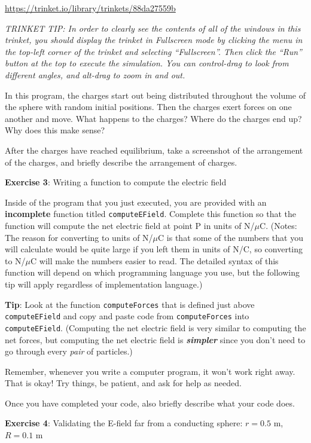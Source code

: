 \documentclass[]{article}
\begin{document}
\url{https://trinket.io/library/trinkets/88da27559b}

\emph{TRINKET TIP: In order to clearly see the contents of all of the
windows in this trinket, you should display the trinket in Fullscreen
mode by clicking the menu in the top-left corner of the trinket and
selecting ``Fullscreen''. Then click the ``Run'' button at the top to
execute the simulation. You can control-drag to look from different
angles, and alt-drag to zoom in and out.}

In this program, the charges start out being distributed throughout the
volume of the sphere with random initial positions. Then the charges
exert forces on one another and move. What happens to the charges? Where
do the charges end up? Why does this make sense?

After the charges have reached equilibrium, take a screenshot of the
arrangement of the charges, and briefly describe the arrangement of
charges.

\textbf{Exercise 3}: Writing a function to compute the electric field

Inside of the program that you just executed, you are provided with an
\textbf{incomplete} function titled \texttt{computeEField}. Complete
this function so that the function will compute the net electric field
at point P in units of N/\(\mu\)C. (Notes: The reason for converting to
units of N/\(\mu\)C is that some of the numbers that you will calculate
would be quite large if you left them in units of N/C, so converting to
N/\(\mu\)C will make the numbers easier to read. The detailed syntax of
this function will depend on which programming language you use, but the
following tip will apply regardless of implementation language.)

\textbf{Tip}: Look at the function \texttt{computeForces} that is
defined just above \texttt{computeEField} and copy and paste code from
\texttt{computeForces} into \texttt{computeEField}. (Computing the net
electric field is very similar to computing the net forces, but
computing the net electric field is \textbf{\emph{simpler}} since you
don't need to go through every \emph{pair} of particles.)

Remember, whenever you write a computer program, it won't work right
away. That is okay! Try things, be patient, and ask for help as needed.

Once you have completed your code, also briefly describe what your code
does.

\textbf{Exercise 4}: Validating the E-field far from a conducting
sphere: \(r = 0.5\) m, \(R = 0.1\) m
\end{document}
